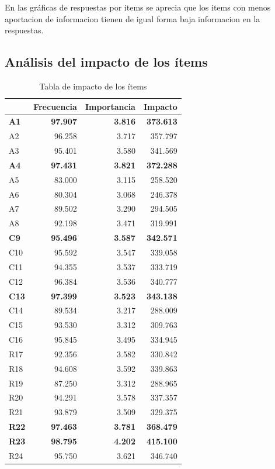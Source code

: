 \documentclass[
  10pt,
  spanish,
]{article}
\begin{document}
En las gráficas de respuestas por items se aprecia que los items con
menos aportacion de informacion tienen de igual forma baja informacion
en la respuestas.

\hypertarget{anuxe1lisis-del-impacto-de-los-uxedtems}{%
\subsection{Análisis del impacto de los
ítems}\label{anuxe1lisis-del-impacto-de-los-uxedtems}}

\begin{table}[H]

\caption{\label{tab:unnamed-chunk-20}Tabla de impacto de los ítems}
\centering
\begin{tabular}[t]{lrrr}
\toprule
  & Frecuencia & Importancia & Impacto\\
\midrule
\textbf{A1} & \textbf{97.907} & \textbf{3.816} & \textbf{373.613}\\
A2 & 96.258 & 3.717 & 357.797\\
A3 & 95.401 & 3.580 & 341.569\\
\textbf{A4} & \textbf{97.431} & \textbf{3.821} & \textbf{372.288}\\
A5 & 83.000 & 3.115 & 258.520\\
\addlinespace
A6 & 80.304 & 3.068 & 246.378\\
A7 & 89.502 & 3.290 & 294.505\\
A8 & 92.198 & 3.471 & 319.991\\
\textbf{C9} & \textbf{95.496} & \textbf{3.587} & \textbf{342.571}\\
C10 & 95.592 & 3.547 & 339.058\\
\addlinespace
C11 & 94.355 & 3.537 & 333.719\\
C12 & 96.384 & 3.536 & 340.777\\
\textbf{C13} & \textbf{97.399} & \textbf{3.523} & \textbf{343.138}\\
C14 & 89.534 & 3.217 & 288.009\\
C15 & 93.530 & 3.312 & 309.763\\
\addlinespace
C16 & 95.845 & 3.495 & 334.945\\
R17 & 92.356 & 3.582 & 330.842\\
R18 & 94.608 & 3.592 & 339.863\\
R19 & 87.250 & 3.312 & 288.965\\
R20 & 94.291 & 3.578 & 337.357\\
\addlinespace
R21 & 93.879 & 3.509 & 329.375\\
\textbf{R22} & \textbf{97.463} & \textbf{3.781} & \textbf{368.479}\\
\textbf{R23} & \textbf{98.795} & \textbf{4.202} & \textbf{415.100}\\
R24 & 95.750 & 3.621 & 346.740\\
\bottomrule
\end{tabular}
\end{table}
\end{document}
